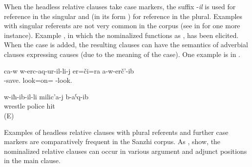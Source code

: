 When the headless relative clauses take case markers, the suffix -\textit{il} is used for reference in the singular and  (in its  form ) for reference in the plural. Examples with singular referents are not very common in the corpus  (see  in  for one more instance). Example , in which the nominalized  functions as , has been elicited. When the  case is added, the resulting clauses can have the semantics of adverbial clauses expressing causes (due to the meaning of the  case). One example is  in . 

\begin{exe}
	\ex	\label{ex:He did not even look at his savior.}
	\gll	ca-w	w-erc-aq-ur-il-li-j	er=či=ra	a-w-erč'-ib\\
			-save.	look=on=	-look.\\
	\glt	{}

	\ex	\label{ex:‎The one who was wrestling hit the police officer}
	\gll	w-iħ-ib-il-li	milic'a-j	b-aˁq-ib\\
		wrestle	police	hit\\
	\glt	{} (E)
\end{exe}


Examples of headless relative clauses with plural referents and further case markers are comparatively frequent in the Sanzhi corpus. As ,  show, the nominalized relative clauses can occur in various argument and adjunct positions in the main clause.

